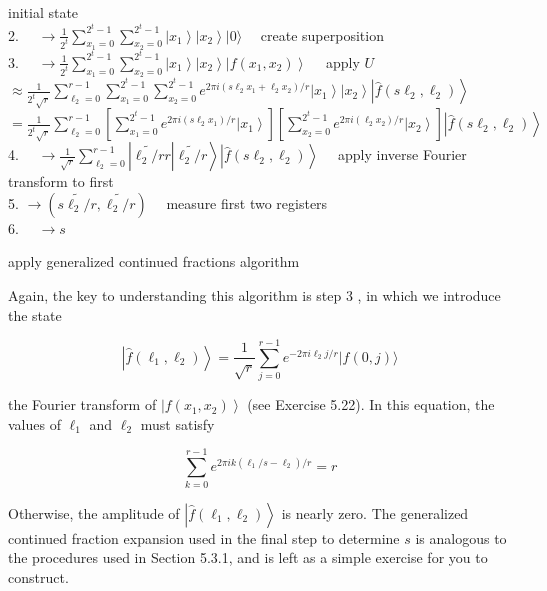 initial state\\
2. $\quad \rightarrow \frac{1}{2^{t}} \sum_{x_{1}=0}^{2^{t}-1} \sum_{x_{2}=0}^{2^{t}-1}\left|x_{1}\right\rangle\left|x_{2}\right\rangle|0\rangle \quad$ create superposition\\
3. $\quad \rightarrow \frac{1}{2^{t}} \sum_{x_{1}=0}^{2^{t}-1} \sum_{x_{2}=0}^{2^{t}-1}\left|x_{1}\right\rangle\left|x_{2}\right\rangle\left|f\left(x_{1}, x_{2}\right)\right\rangle \quad$ apply $U$ $\approx \frac{1}{2^{t} \sqrt{r}} \sum_{\ell_{2}=0}^{r-1} \sum_{x_{1}=0}^{2^{t}-1} \sum_{x_{2}=0}^{2^{t}-1} e^{2 \pi i\left(s \ell_{2} x_{1}+\ell_{2} x_{2}\right) / r}\left|x_{1}\right\rangle\left|x_{2}\right\rangle\left|\hat{f}\left(s \ell_{2}, \ell_{2}\right)\right\rangle$ $=\frac{1}{2^{t} \sqrt{r}} \sum_{\ell_{2}=0}^{r-1}\left[\sum_{x_{1}=0}^{2^{t}-1} e^{2 \pi i\left(s \ell_{2} x_{1}\right) / r}\left|x_{1}\right\rangle\right]\left[\sum_{x_{2}=0}^{2^{t}-1} e^{2 \pi i\left(\ell_{2} x_{2}\right) / r}\left|x_{2}\right\rangle\right]\left|\hat{f}\left(s \ell_{2}, \ell_{2}\right)\right\rangle$\\
4. $\left.\quad \rightarrow \frac{1}{\sqrt{r}} \sum_{\ell_{2}=0}^{r-1}\left|\widetilde{\ell_{2} / r} r\right| \widetilde{\ell_{2} / r}\right\rangle\left|\hat{f}\left(s \ell_{2}, \ell_{2}\right)\right\rangle \quad$ apply inverse Fourier transform to first\\
5. $\rightarrow\left(\widetilde{s \ell_{2} / r}, \widetilde{\ell_{2} / r}\right) \quad$ measure first two registers\\
6. $\quad \rightarrow s$

apply generalized continued fractions algorithm

Again, the key to understanding this algorithm is step 3 , in which we introduce the state

\begin{equation*}
\left|\hat{f}\left(\ell_{1}, \ell_{2}\right)\right\rangle=\frac{1}{\sqrt{r}} \sum_{j=0}^{r-1} e^{-2 \pi i \ell_{2} j / r}|f(0, j)\rangle \tag{5.70}
\end{equation*}

the Fourier transform of $\left|f\left(x_{1}, x_{2}\right)\right\rangle$ (see Exercise 5.22). In this equation, the values of $\ell_{1}$ and $\ell_{2}$ must satisfy

\begin{equation*}
\sum_{k=0}^{r-1} e^{2 \pi i k\left(\ell_{1} / s-\ell_{2}\right) / r}=r \tag{5.71}
\end{equation*}

Otherwise, the amplitude of $\left|\hat{f}\left(\ell_{1}, \ell_{2}\right)\right\rangle$ is nearly zero. The generalized continued fraction expansion used in the final step to determine $s$ is analogous to the procedures used in Section 5.3.1, and is left as a simple exercise for you to construct.

